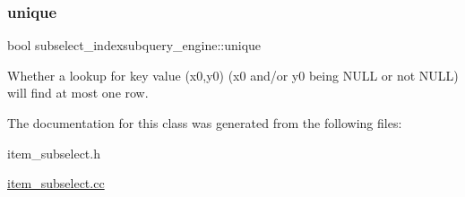 \subsubsection{\texorpdfstring{unique}{unique}}
{\footnotesize\ttfamily bool subselect\+\_\+indexsubquery\+\_\+engine\+::unique\hspace{0.3cm}{\ttfamily [protected]}}

Whether a lookup for key value (x0,y0) (x0 and/or y0 being N\+U\+LL or not N\+U\+LL) will find at most one row. 

The documentation for this class was generated from the following files\+:\begin{DoxyCompactItemize}
\item 
item\+\_\+subselect.\+h\item 
\mbox{\hyperlink{item__subselect_8cc}{item\+\_\+subselect.\+cc}}\end{DoxyCompactItemize}

